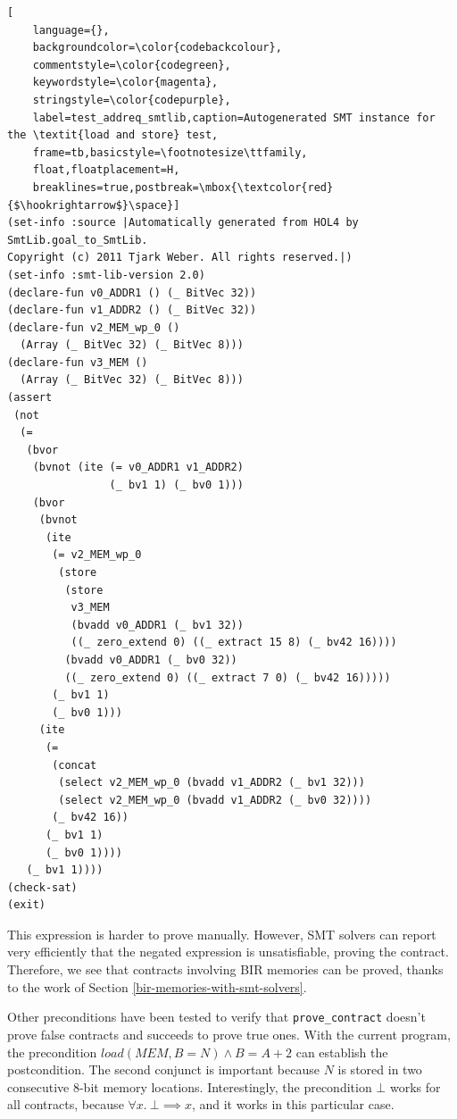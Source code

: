 \documentclass{kththesis}
\begin{document}
{\begin{lstlisting}[
    language={},
    backgroundcolor=\color{codebackcolour},
    commentstyle=\color{codegreen},
    keywordstyle=\color{magenta},
    stringstyle=\color{codepurple},
    label=test_addreq_smtlib,caption=Autogenerated SMT instance for the \textit{load and store} test,
    frame=tb,basicstyle=\footnotesize\ttfamily,
    float,floatplacement=H,
    breaklines=true,postbreak=\mbox{\textcolor{red}{$\hookrightarrow$}\space}]
(set-info :source |Automatically generated from HOL4 by SmtLib.goal_to_SmtLib.
Copyright (c) 2011 Tjark Weber. All rights reserved.|)
(set-info :smt-lib-version 2.0)
(declare-fun v0_ADDR1 () (_ BitVec 32))
(declare-fun v1_ADDR2 () (_ BitVec 32))
(declare-fun v2_MEM_wp_0 ()
  (Array (_ BitVec 32) (_ BitVec 8)))
(declare-fun v3_MEM ()
  (Array (_ BitVec 32) (_ BitVec 8)))
(assert
 (not
  (=
   (bvor
    (bvnot (ite (= v0_ADDR1 v1_ADDR2)
                (_ bv1 1) (_ bv0 1)))
    (bvor
     (bvnot
      (ite
       (= v2_MEM_wp_0
        (store
         (store
          v3_MEM
          (bvadd v0_ADDR1 (_ bv1 32))
          ((_ zero_extend 0) ((_ extract 15 8) (_ bv42 16))))
         (bvadd v0_ADDR1 (_ bv0 32))
         ((_ zero_extend 0) ((_ extract 7 0) (_ bv42 16)))))
       (_ bv1 1)
       (_ bv0 1)))
     (ite
      (=
       (concat
        (select v2_MEM_wp_0 (bvadd v1_ADDR2 (_ bv1 32)))
        (select v2_MEM_wp_0 (bvadd v1_ADDR2 (_ bv0 32))))
       (_ bv42 16))
      (_ bv1 1)
      (_ bv0 1))))
   (_ bv1 1))))
(check-sat)
(exit)
\end{lstlisting}

This expression is harder to prove manually. However, SMT solvers can report very efficiently that the negated expression is unsatisfiable, proving the contract. Therefore, we see that contracts involving BIR memories can be proved, thanks to the work of Section \ref{bir-memories-with-smt-solvers}.

Other preconditions have been tested to verify that \texttt{prove\_contract} doesn't prove false contracts and succeeds to prove true ones. With the current program, the precondition $load(MEM,B=N) \land B=A+2$ can establish the postcondition. The second conjunct is important because $N$ is stored in two consecutive 8-bit memory locations. Interestingly, the precondition $\bot$ works for all contracts, because $\forall x.~\bot \implies x$, and it works in this particular case.


}
\end{document}
